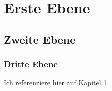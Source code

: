 \section{Erste Ebene}\label{sec:ebene}
\blindtext
\subsection{Zweite Ebene}\label{sec:subebene}
\blindtext[1]
\subsubsection{Dritte Ebene}\label{sec:subsubebene}
Ich referenziere hier auf Kapitel \ref{sec:ebene}.
\blindtext[2]